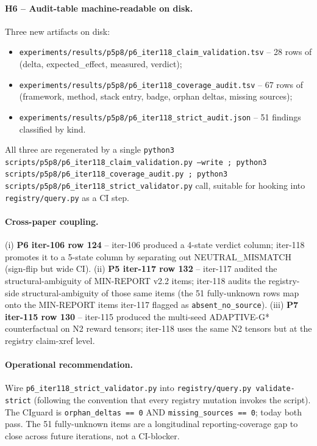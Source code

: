 \paragraph{H6 -- Audit-table machine-readable on disk.}
Three new artifacts on disk:
\begin{itemize}
\item \texttt{experiments/results/p5p8/p6\_iter118\_claim\_validation.tsv}
      -- 28 rows of (delta, expected\_effect, measured, verdict);
\item \texttt{experiments/results/p5p8/p6\_iter118\_coverage\_audit.tsv}
      -- 67 rows of (framework, method, stack entry, badge, orphan deltas,
      missing sources);
\item \texttt{experiments/results/p5p8/p6\_iter118\_strict\_audit.json}
      -- 51 findings classified by kind.
\end{itemize}
All three are regenerated by a single
\texttt{python3 scripts/p5p8/p6\_iter118\_claim\_validation.py --write ;
python3 scripts/p5p8/p6\_iter118\_coverage\_audit.py ;
python3 scripts/p5p8/p6\_iter118\_strict\_validator.py} call, suitable for
hooking into \texttt{registry/query.py} as a CI step.

\paragraph{Cross-paper coupling.}
(i) \textbf{P6 iter-106 row 124} -- iter-106 produced a 4-state verdict
column; iter-118 promotes it to a 5-state column by separating out
NEUTRAL\_MISMATCH (sign-flip but wide CI). (ii) \textbf{P5 iter-117 row
132} -- iter-117 audited the structural-ambiguity of MIN-REPORT v2.2 items;
iter-118 audits the registry-side structural-ambiguity of those same
items (the 51 fully-unknown rows map onto the MIN-REPORT items iter-117
flagged as \texttt{absent\_no\_source}). (iii) \textbf{P7 iter-115 row 130}
-- iter-115 produced the multi-seed ADAPTIVE-G* counterfactual on N2
reward tensors; iter-118 uses the same N2 tensors but at the registry
claim-xref level.

\paragraph{Operational recommendation.}
Wire \texttt{p6\_iter118\_strict\_validator.py} into
\texttt{registry/query.py validate-strict} (following the convention that
every registry mutation invokes the script). The CIguard is
\texttt{orphan\_deltas == 0} AND \texttt{missing\_sources == 0}; today
both pass. The 51 fully-unknown items are a longitudinal reporting-coverage
gap to close across future iterations, not a CI-blocker.
